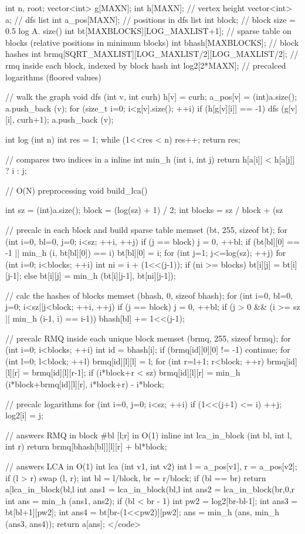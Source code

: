 int n, root;
vector<int> g[MAXN];
int h[MAXN]; // vertex height
vector<int> a; // dfs list
int a_pos[MAXN]; // positions in dfs list
int block; // block size = 0.5 log A. size()
int bt[MAXBLOCKS][LOG_MAXLIST+1]; // sparse table on blocks (relative positions in minimum blocks)
int bhash[MAXBLOCKS]; // block hashes
int brmq[SQRT_MAXLIST][LOG_MAXLIST/2][LOG_MAXLIST/2]; // rmq inside each block, indexed by block hash
int log2[2*MAXN]; // precalced logarithms (floored values)

// walk the graph
void dfs (int v, int curh) {
h[v] = curh;
a_pos[v] = (int)a.size();
a.push_back (v);
for (size_t i=0; i<g[v].size(); ++i)
if (h[g[v][i]] == -1) {
dfs (g[v][i], curh+1);
a.push_back (v);
}
}

int log (int n) {
int res = 1;
while (1<<res < n) res++;
return res;
}

// compares two indices in a
inline int min_h (int i, int j) {
return h[a[i]] < h[a[j]] ? i : j;
}

// O(N) preprocessing
void build_lca() {
int sz = (int)a.size();
block = (log(sz) + 1) / 2;
int blocks = sz / block + (sz %

// precalc in each block and build sparse table
memset (bt, 255, sizeof bt);
for (int i=0, bl=0, j=0; i<sz; ++i, ++j) {
if (j == block)
j = 0, ++bl;
if (bt[bl][0] == -1 || min_h (i, bt[bl][0]) == i)
bt[bl][0] = i;
}
for (int j=1; j<=log(sz); ++j)
for (int i=0; i<blocks; ++i) {
int ni = i + (1<<(j-1));
if (ni >= blocks)
bt[i][j] = bt[i][j-1];
else
bt[i][j] = min_h (bt[i][j-1], bt[ni][j-1]);
}

// calc the hashes of blocks
memset (bhash, 0, sizeof bhash);
for (int i=0, bl=0, j=0; i<sz||j<block; ++i, ++j) {
if (j == block)
j = 0, ++bl;
if (j > 0 && (i >= sz || min_h (i-1, i) == i-1))
bhash[bl] += 1<<(j-1);
}

// precalc RMQ inside each unique block
memset (brmq, 255, sizeof brmq);
for (int i=0; i<blocks; ++i) {
int id = bhash[i];
if (brmq[id][0][0] != -1) continue;
for (int l=0; l<block; ++l) {
brmq[id][l][l] = l;
for (int r=l+1; r<block; ++r) {
brmq[id][l][r] = brmq[id][l][r-1];
if (i*block+r < sz)
brmq[id][l][r] =
min_h (i*block+brmq[id][l][r], i*block+r) - i*block;
}
}
}

// precalc logarithms
for (int i=0, j=0; i<sz; ++i) {
if (1<<(j+1) <= i) ++j;
log2[i] = j;
}
}

// answers RMQ in block #bl [l;r] in O(1)
inline int lca_in_block (int bl, int l, int r) {
return brmq[bhash[bl]][l][r] + bl*block;
}

// answers LCA in O(1)
int lca (int v1, int v2) {
int l = a_pos[v1], r = a_pos[v2];
if (l > r) swap (l, r);
int bl = l/block, br = r/block;
if (bl == br)
return a[lca_in_block(bl,l%
int ans1 = lca_in_block(bl,l%
int ans2 = lca_in_block(br,0,r%
int ans = min_h (ans1, ans2);
if (bl < br - 1) {
int pw2 = log2[br-bl-1];
int ans3 = bt[bl+1][pw2];
int ans4 = bt[br-(1<<pw2)][pw2];
ans = min_h (ans, min_h (ans3, ans4));
}
return a[ans];
}</code>